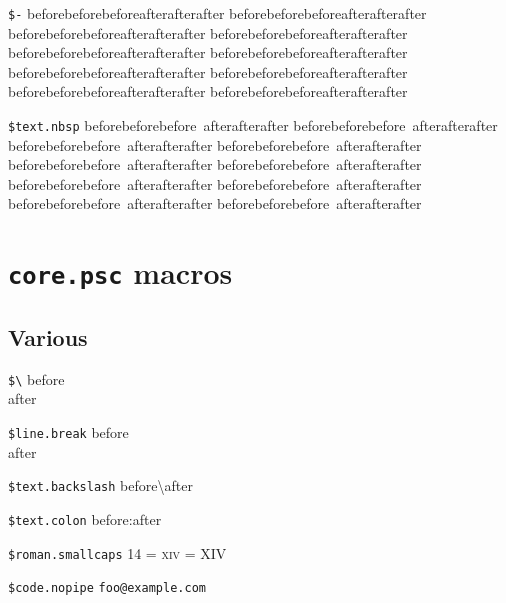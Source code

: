 \documentclass[demo]{pyscribe}
\begin{document}
\par\medskip
\texttt{\$-} beforebeforebefore\-afterafterafter beforebeforebefore\-afterafterafter beforebeforebefore\-afterafterafter beforebeforebefore\-afterafterafter beforebeforebefore\-afterafterafter beforebeforebefore\-afterafterafter beforebeforebefore\-afterafterafter beforebeforebefore\-afterafterafter beforebeforebefore\-afterafterafter beforebeforebefore\-afterafterafter 
\par\medskip
\texttt{\$text.nbsp} beforebeforebefore~afterafterafter beforebeforebefore~afterafterafter beforebeforebefore~afterafterafter beforebeforebefore~afterafterafter beforebeforebefore~afterafterafter beforebeforebefore~afterafterafter beforebeforebefore~afterafterafter beforebeforebefore~afterafterafter beforebeforebefore~afterafterafter beforebeforebefore~afterafterafter 

\chapter{\texttt{core.psc} macros}

\section{Various}

\par\medskip
\texttt{\$\textbackslash{}} before \\ after
\par\medskip
\texttt{\$line.break} before \\ after

\par\medskip
\texttt{\$text.backslash} before\textbackslash{}after
\par\medskip
\texttt{\$text.colon} before\string:after
\par\medskip
\texttt{\$roman.smallcaps} 14 = \textsc{xiv} = XIV
\par\medskip
\texttt{\$code.nopipe} \verb|foo@example.com|
\end{document}
